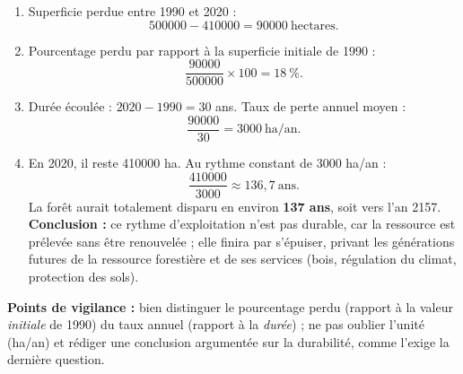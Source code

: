 \documentclass[11pt]{article}
\begin{document}
\begin{corrige}
\begin{enumerate}
\item Superficie perdue entre 1990 et 2020 :
\[ 500000 - 410000 = \num{90000}\ \text{hectares}. \]
\item Pourcentage perdu par rapport à la superficie initiale de 1990 :
\[ \frac{90000}{500000}\times 100 = 18\ \%. \]
\item Durée écoulée : $2020 - 1990 = 30$ ans. Taux de perte annuel moyen :
\[ \frac{90000}{30} = \num{3000}\ \text{ha/an}. \]
\item En 2020, il reste \num{410000} ha. Au rythme constant de \num{3000} ha/an :
\[ \frac{410000}{3000} \approx 136,7\ \text{ans}. \]
La forêt aurait totalement disparu en environ \textbf{137 ans}, soit vers l'an 2157. \textbf{Conclusion :} ce rythme d'exploitation n'est pas durable, car la ressource est prélevée sans être renouvelée ; elle finira par s'épuiser, privant les générations futures de la ressource forestière et de ses services (bois, régulation du climat, protection des sols).
\end{enumerate}
\textbf{Points de vigilance :} bien distinguer le pourcentage perdu (rapport à la valeur \emph{initiale} de 1990) du taux annuel (rapport à la \emph{durée}) ; ne pas oublier l'unité (ha/an) et rédiger une conclusion argumentée sur la durabilité, comme l'exige la dernière question.
\end{corrige}
\end{document}
